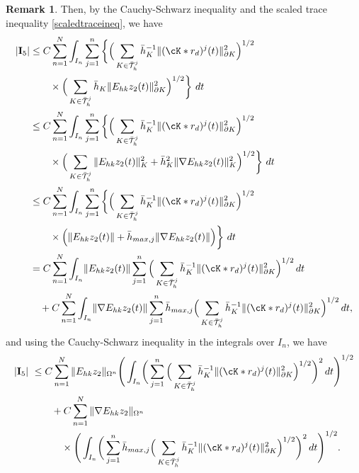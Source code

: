 \documentclass{amsart}
\numberwithin{equation}{section}
\theoremstyle{definition}
\newtheorem{remark}{Remark}
\begin{document}
\begin{remark}
Then, by the Cauchy-Schwarz inequality and the scaled trace 
inequality \eqref{scaledtraceineq}, we have
\begin{equation*}   
  \begin{split}
    |{\rm{\bf I}}_5|
    &\le C\sum_{n=1}^N\int_{I_n}\sum_{j=1}^n
    \bigg\{
    \Big(\sum_{K\in\bar{\mathcal T}_h^j}\bar h_K^{-1}
    \|(\cK*r_d)^j(t)\|_{\partial K}^2
    \Big)^{1/2}\\
    &\quad\quad \times
    \Big(\sum_{K\in\bar{\mathcal T}_h^j}\bar h_K
    \|E_{hk}z_2(t)\|_{\partial K}^2
    \Big)^{1/2} \bigg\}\ dt \\
    &\le C\sum_{n=1}^N\int_{I_n}\sum_{j=1}^n
    \bigg\{
    \Big(\sum_{K\in\bar{\mathcal T}_h^j}\bar h_K^{-1}
    \|(\cK*r_d)^j(t)\|_{\partial K}^2
    \Big)^{1/2}\\
    &\quad\quad \times
    \Big(\sum_{K\in\bar{\mathcal T}_h^j}\|E_{hk}z_2(t)\|_K^2
    +\bar h_K^2 \|\nabla E_{hk}z_2(t)\|_K^2
    \Big)^{1/2}\bigg\}\ dt \\
    &\le C\sum_{n=1}^N\int_{I_n}\sum_{j=1}^n
    \bigg\{
    \Big(\sum_{K\in\bar{\mathcal T}_h^j}\bar h_K^{-1}
    \|(\cK*r_d)^j(t)\|_{\partial K}^2
    \Big)^{1/2}\\
    &\quad\quad \times
    \Big(\|E_{hk}z_2(t)\|+\bar h_{max,j}\|\nabla E_{hk}z_2(t)\|
    \Big) \bigg\}\ dt \\
    &= C\sum_{n=1}^N\int_{I_n}\!
    \|E_{hk}z_2(t)\|\sum_{j=1}^n
    \Big(\sum_{K\in\bar{\mathcal T}_h^j}\bar h_K^{-1}
    \|(\cK*r_d)^j(t)\|_{\partial K}^2
    \Big)^{1/2}\,dt\\
    &\quad +C\sum_{n=1}^N\int_{I_n}\!
    \|\nabla E_{hk}z_2(t)\|
    \sum_{j=1}^n\bar h_{max,j}
    \Big(\sum_{K\in\bar{\mathcal T}_h^j}\bar h_K^{-1}
    \|(\cK*r_d)^j(t)\|_{\partial K}^2
    \Big)^{1/2}\,dt,
  \end{split}
\end{equation*}
and using the Cauchy-Schwarz inequality in the integrals over $I_n$, we have 
\begin{equation*}  
  \begin{split}
    |{\rm{\bf I}}_5|\
    &\le C \sum_{n=1}^N \|E_{hk}z_2\|_{\Omega^n}
    \Bigg(\int_{I_n}\!\bigg(
    \sum_{j=1}^n
    \Big(\sum_{K\in\bar{\mathcal T}_h^j}\bar h_K^{-1}
    \|(\cK*r_d)^j(t)\|_{\partial K}^2
    \Big)^{1/2}\bigg)^2\,dt\Bigg)^{1/2}\\
    &\qquad+C\sum_{n=1}^N \|\nabla E_{hk}z_2\|_{\Omega^n}\\
    &\quad\quad\quad\times
    \Bigg(\int_{I_n}\!\bigg(
    \sum_{j=1}^n \bar h_{max,j}
    \Big(\sum_{K\in\bar{\mathcal T}_h^j}\bar h_K^{-1}
    \|(\cK*r_d)^j(t)\|_{\partial K}^2
    \Big)^{1/2}\bigg)^2\,dt\Bigg)^{1/2}.
  \end{split}
\end{equation*}


\end{remark}
\end{document}
